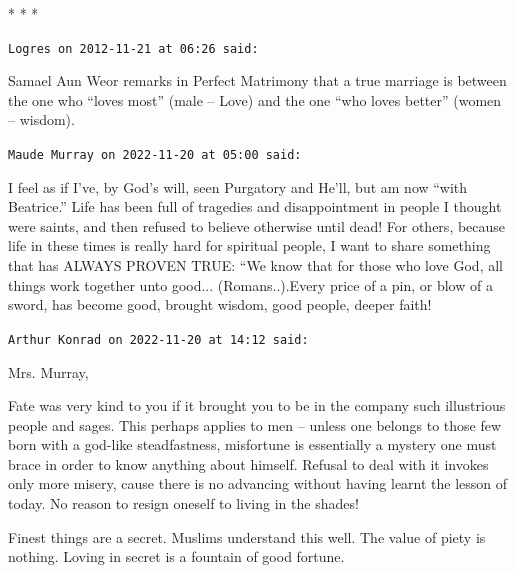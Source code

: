 
\begin{center}* * *\end{center}

\begin{footnotesize}
\begin{sffamily}
\texttt{Logres on 2012-11-21 at 06:26 said:}

Samael Aun Weor remarks in Perfect Matrimony that a true marriage is between the one who ``loves most'' (male -- Love) and the one ``who loves better'' (women -- wisdom).

\hfill

\texttt{Maude Murray on 2022-11-20 at 05:00 said:}

I feel as if I've, by God's will, seen Purgatory and He'll, but am now ``with Beatrice.'' Life has been full of tragedies and disappointment in people I thought were saints, and then refused to believe otherwise until dead! For others, because life in these times is really hard for spiritual people, I want to share something that has ALWAYS PROVEN TRUE: ``We know that for those who love God, all things work together unto good... (Romans..).Every price of a pin, or blow of a sword, has become good, brought wisdom, good people, deeper faith!

\hfill

\texttt{Arthur Konrad on 2022-11-20 at 14:12 said:}

Mrs. Murray,

Fate was very kind to you if it brought you to be in the company such illustrious people and sages. This perhaps applies to men -- unless one belongs to those few born with a god-like steadfastness, misfortune is essentially a mystery one must brace in order to know anything about himself. Refusal to deal with it invokes only more misery, cause there is no advancing without having learnt the lesson of today. No reason to resign oneself to living in the shades!

Finest things are a secret. Muslims understand this well. The value of piety is nothing. Loving in secret is a fountain of good fortune.


\hfill

\end{sffamily}
\end{footnotesize}

